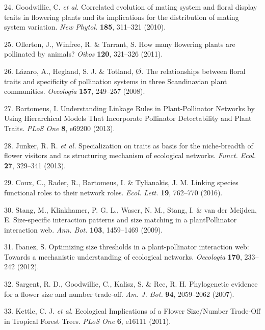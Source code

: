 \documentclass[
  12pt,
  a4paper,
]{article}
\begin{document}
\leavevmode\hypertarget{ref-goodwillie2010}{}%
24. Goodwillie, C. \emph{et al.} Correlated evolution of mating system and floral display traits in flowering plants and its implications for the distribution of mating system variation. \emph{New Phytol.} \textbf{185}, 311--321 (2010).

\leavevmode\hypertarget{ref-ollerton2011}{}%
25. Ollerton, J., Winfree, R. \& Tarrant, S. How many flowering plants are pollinated by animals? \emph{Oikos} \textbf{120}, 321--326 (2011).

\leavevmode\hypertarget{ref-lazaro2008}{}%
26. Lázaro, A., Hegland, S. J. \& Totland, Ø. The relationships between floral traits and specificity of pollination systems in three Scandinavian plant communities. \emph{Oecologia} \textbf{157}, 249--257 (2008).

\leavevmode\hypertarget{ref-bartomeus2013}{}%
27. Bartomeus, I. Understanding Linkage Rules in Plant-Pollinator Networks by Using Hierarchical Models That Incorporate Pollinator Detectability and Plant Traits. \emph{PLoS One} \textbf{8}, e69200 (2013).

\leavevmode\hypertarget{ref-junker2013}{}%
28. Junker, R. R. \emph{et al.} Specialization on traits as basis for the niche-breadth of flower visitors and as structuring mechanism of ecological networks. \emph{Funct. Ecol.} \textbf{27}, 329--341 (2013).

\leavevmode\hypertarget{ref-coux2016}{}%
29. Coux, C., Rader, R., Bartomeus, I. \& Tylianakis, J. M. Linking species functional roles to their network roles. \emph{Ecol. Lett.} \textbf{19}, 762--770 (2016).

\leavevmode\hypertarget{ref-stang2009}{}%
30. Stang, M., Klinkhamer, P. G. L., Waser, N. M., Stang, I. \& van der Meijden, E. Size-specific interaction patterns and size matching in a plantPollinator interaction web. \emph{Ann. Bot.} \textbf{103}, 1459--1469 (2009).

\leavevmode\hypertarget{ref-ibanez2012}{}%
31. Ibanez, S. Optimizing size thresholds in a plant-pollinator interaction web: Towards a mechanistic understanding of ecological networks. \emph{Oecologia} \textbf{170}, 233--242 (2012).

\leavevmode\hypertarget{ref-sargent2007}{}%
32. Sargent, R. D., Goodwillie, C., Kalisz, S. \& Ree, R. H. Phylogenetic evidence for a flower size and number trade-off. \emph{Am. J. Bot.} \textbf{94}, 2059--2062 (2007).

\leavevmode\hypertarget{ref-kettle2011}{}%
33. Kettle, C. J. \emph{et al.} Ecological Implications of a Flower Size/Number Trade-Off in Tropical Forest Trees. \emph{PLoS One} \textbf{6}, e16111 (2011).
\end{document}
